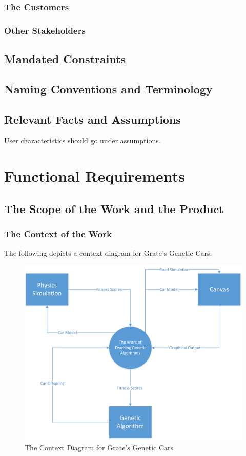 \documentclass[12pt, titlepage]{article}
\begin{document}
\subsubsection{The Customers}

\subsubsection{Other Stakeholders}

\subsection{Mandated Constraints}

\subsection{Naming Conventions and Terminology}

\subsection{Relevant Facts and Assumptions}

User characteristics should go under assumptions.

\section{Functional Requirements}

\subsection{The Scope of the Work and the Product}

\subsubsection{The Context of the Work}
The following depicts a context diagram for Grate's Genetic Cars:

\begin{figure}[h]
  \includegraphics[width=\linewidth]{ContextDiagram.png}
  \caption{The Context Diagram for Grate's Genetic Cars}
\end{figure}
\end{document}
